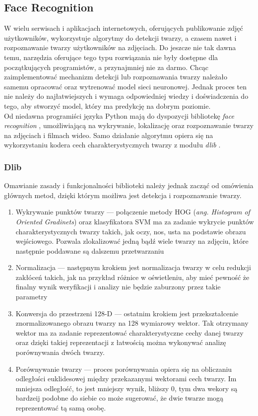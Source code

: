 \subsection{Face Recognition }
W wielu serwisach i aplikacjach internetowych, oferujących publikowanie zdjęć użytkowników, wykorzystuje algorytmy do detekcji twarzy, a czasem nawet i rozpoznawanie twarzy użytkowników na zdjęciach. Do jeszcze nie tak dawna temu, narzędzia oferujące tego typu rozwiązania nie były dostępne dla początkujących programistów, a przynajmniej nie za darmo. Chcąc zaimplementować mechanizm detekcji lub rozpoznawania twarzy należało samemu opracować oraz wytrenować model sieci neuronowej. Jednak proces ten nie należy do najłatwiejszych i wymaga odpowiedniej wiedzy i doświadczenia do tego, aby stworzyć model, który ma predykcję na dobrym poziomie. \\
Od niedawna programiści języka Python mają do dyspozycji bibliotekę \emph{face recognition} \cite{facerecogn}, umożliwiającą na wykrywanie, lokalizację oraz rozpoznawanie twarzy na zdjęciach i filmach wideo. Samo działanie algorytmu opiera się na wykorzystaniu kodera cech charakterystycznych twarzy z modułu \emph{dlib} \cite{dlib09}.

\subsubsection{Dlib}
Omawianie zasady i funkcjonalności biblioteki należy jednak zacząć od omówienia głównych metod, dzięki którym możliwa jest detekcja i rozpoznawanie twarzy. \\
\begin{enumerate}
  \item Wykrywanie punktów twarzy --- połączenie metody HOG (\emph{ang. Histogram of Oriented Gradinets}) oraz klasyfikatora SVM ma za zadanie wykrycie punktów charakterystycznych twarzy takich, jak oczy, nos, usta na podstawie obrazu wejściowego. Pozwala zlokalizować jedną bądź wiele twarzy na zdjęciu, które następnie poddawane są dalszemu przetwarzaniu
  \item Normalizacja --- następnym krokiem jest normalizacja twarzy w celu redukcji zakłóceń takich, jak na przykład różnice w oświetleniu, aby mieć pewność że finalny wynik weryfikacji i analizy nie będzie zaburzony przez takie parametry
  \item Konwersja do przestrzeni 128-D --- ostatnim krokiem jest przekształcenie znormalizowanego obrazu twarzy na 128 wymiarowy wektor. Tak otrzymany wektor ma za zadanie reprezentować charakterystyczne cechy danej twarzy oraz dzięki takiej reprezentacji z łatwością można wykonywać analizę porównywania dwóch twarzy.
  \item Porównywanie twarzy --- proces porównywania opiera się na obliczaniu odległości euklidesowej między przekazanymi wektorami cech twarzy. Im mniejsza odległość, to jest mniejszy wynik, bliższy 0, tym dwa wekory są bardzeij podobne do siebie co może sugerować, że dwie twarze mogą reprezentować tą samą osobę.
\end{enumerate}

